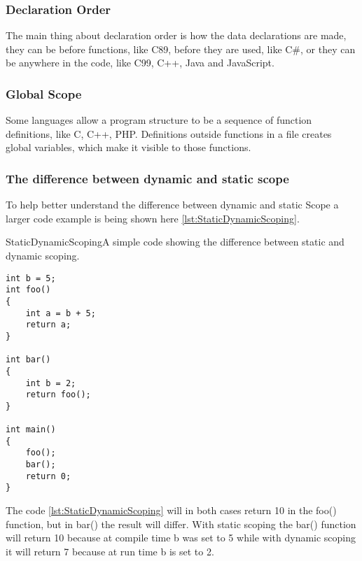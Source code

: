 \subsubsection{Declaration Order}
The main thing about declaration order is how the data declarations are made, they can be before functions, like C89, before they are used, like C\#, or they can be anywhere in the code, like C99, C++, Java and JavaScript.

\subsubsection{Global Scope}
Some languages allow a program structure to be a sequence of function definitions, like C, C++, PHP. Definitions outside functions in a file creates global variables, which make it visible to those functions.

\subsubsection{The difference between dynamic and static scope}
To help better understand the difference between dynamic and static Scope a larger code example is being shown here \ref{lst:StaticDynamicScoping}.
\begin{code}{StaticDynamicScoping}{A simple code showing the difference between static and dynamic scoping. \citep{StaticvsDynamic}}
\begin{lstlisting}
int b = 5;
int foo()
{
	int a = b + 5;
	return a;
}

int bar()
{
	int b = 2;
	return foo();
}

int main()
{
	foo();
	bar();
	return 0;
}
\end{lstlisting}
\end{code}
The code \ref{lst:StaticDynamicScoping} will in both cases return 10 in the foo() function, but in bar() the result will differ. With static scoping the bar() function will return 10 because at compile time b was set to 5 while with dynamic scoping it will return 7 because at run time b is set to 2.